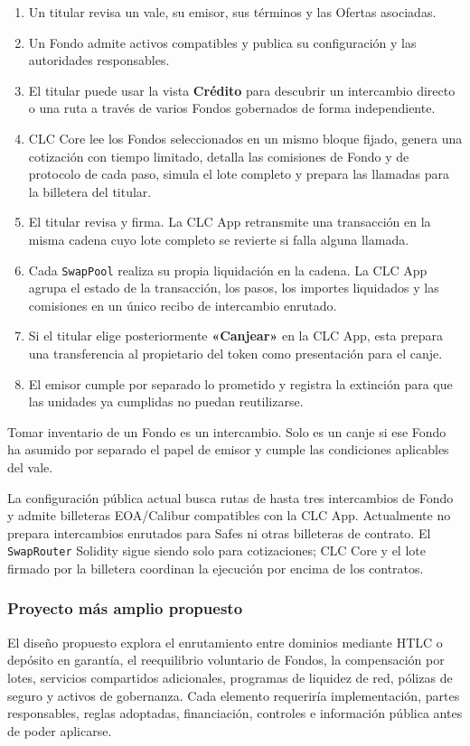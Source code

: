\documentclass[11pt]{article}
\begin{document}
\begin{enumerate}[leftmargin=*]
\item Un titular revisa un vale, su emisor, sus términos y las Ofertas asociadas.
\item Un Fondo admite activos compatibles y publica su configuración y las autoridades responsables.
\item El titular puede usar la vista \textbf{Crédito} para descubrir un intercambio directo o una ruta a través de varios Fondos gobernados de forma independiente.
\item CLC Core lee los Fondos seleccionados en un mismo bloque fijado, genera una cotización con tiempo limitado, detalla las comisiones de Fondo y de protocolo de cada paso, simula el lote completo y prepara las llamadas para la billetera del titular.
\item El titular revisa y firma. La CLC App retransmite una transacción en la misma cadena cuyo lote completo se revierte si falla alguna llamada.
\item Cada \texttt{SwapPool} realiza su propia liquidación en la cadena. La CLC App agrupa el estado de la transacción, los pasos, los importes liquidados y las comisiones en un único recibo de intercambio enrutado.
\item Si el titular elige posteriormente \textbf{«Canjear»} en la CLC App, esta prepara una transferencia al propietario del token como presentación para el canje.
\item El emisor cumple por separado lo prometido y registra la extinción para que las unidades ya cumplidas no puedan reutilizarse.
\end{enumerate}
Tomar inventario de un Fondo es un intercambio. Solo es un canje si ese Fondo ha asumido por separado el papel de emisor y cumple las condiciones aplicables del vale.

La configuración pública actual busca rutas de hasta tres intercambios de Fondo y admite billeteras EOA/Calibur compatibles con la CLC App. Actualmente no prepara intercambios enrutados para Safes ni otras billeteras de contrato. El \texttt{SwapRouter} Solidity sigue siendo solo para cotizaciones; CLC Core y el lote firmado por la billetera coordinan la ejecución por encima de los contratos.

\subsubsection*{Proyecto más amplio propuesto}

El diseño propuesto explora el enrutamiento entre dominios mediante HTLC o depósito en garantía, el reequilibrio voluntario de Fondos, la compensación por lotes, servicios compartidos adicionales, programas de liquidez de red, pólizas de seguro y activos de gobernanza. Cada elemento requeriría implementación, partes responsables, reglas adoptadas, financiación, controles e información pública antes de poder aplicarse.
\end{document}
